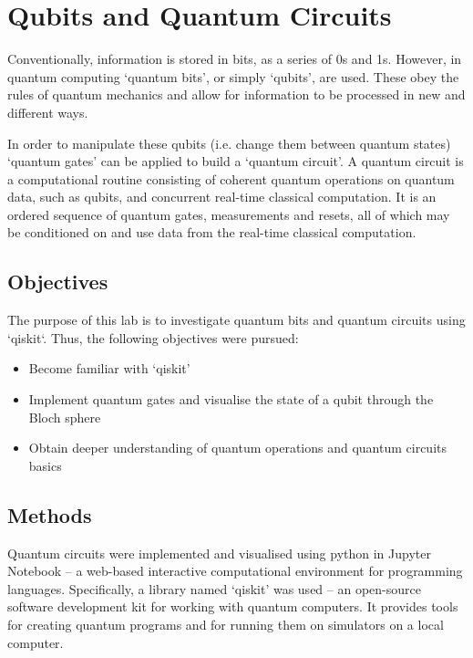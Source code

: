 \renewcommand{\chaptername}{March 8th: Lab}
\chapter{Qubits and Quantum Circuits}

Conventionally, information is stored in bits, as a series of 0s and 1s. However, in quantum computing `quantum bits', or simply `qubits', are used. These obey the rules of quantum mechanics and allow for information to be processed in new and different ways. %

In order to manipulate these qubits (i.e. change them between quantum states) `quantum gates' can be applied to build a `quantum circuit'. A quantum circuit is a computational routine consisting of coherent quantum operations on quantum data, such as qubits, and concurrent real-time classical computation. It is an ordered sequence of quantum gates, measurements and resets, all of which may be conditioned on and use data from the real-time classical computation.

\section{Objectives}
The purpose of this lab is to investigate quantum bits and quantum circuits using `qiskit`. Thus, the following objectives were pursued:
\begin{itemize}
    \item Become familiar with `qiskit'
    \item Implement quantum gates and visualise the state of a qubit through the Bloch sphere
    \item Obtain deeper understanding of quantum operations and quantum circuits basics
\end{itemize}

\section{Methods}
Quantum circuits were implemented and visualised using python in Jupyter Notebook -- a web-based interactive computational environment for programming languages. Specifically, a library named `qiskit' was used -- an open-source software development kit for working with quantum computers. It provides tools for creating quantum programs and for running them on simulators on a local computer. 

